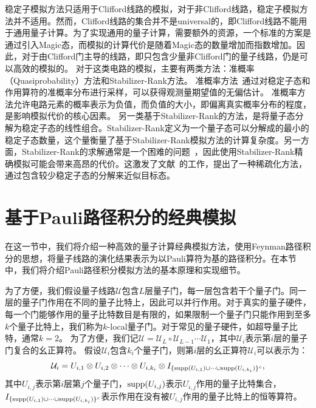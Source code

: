 稳定子模拟方法只适用于Clifford线路的模拟，对于非Clifford线路，稳定子模拟方法并不适用。然而，Clifford线路的集合并不是universal的，即Clifford线路不能用于通用量子计算。为了实现通用的量子计算，需要额外的资源，一个标准的方案是通过引入Magic态，而模拟的计算代价是随着Magic态的数量增加而指数增加。因此，对于由Clifford门主导的线路，即只包含少量非Clifford门的量子线路，仍是可以高效的模拟的。
对于这类电路的模拟，主要有两类方法：准概率（Quasiprobability）方法和Stabilizer-Rank方法。
准概率方法~\cite{pashayan2015estimating}通过对稳定子态和作用算符的准概率分布进行采样，可以获得观测量期望值的无偏估计。
准概率方法允许电路元素的概率表示为负值，而负值的大小，即偏离真实概率分布的程度，是影响模拟代价的核心因素。
另一类基于Stabilizer-Rank的方法，是将量子态分解为稳定子态的线性组合。Stabilizer-Rank定义为一个量子态可以分解成的最小的稳定子态数量，这个量衡量了基于Stabilizer-Rank模拟方法的计算复杂度。另一方面，Stabilizer-Rank的求解通常是一个困难的问题~\cite{bravyi2016improved}，因此使用Stabilizer-Rank精确模拟可能会带来高昂的代价。这激发了文献~\cite{bravyi2019simulation,qassim2019clifford}的工作，提出了一种稀疏化方法，通过包含较少稳定子态的分解来近似目标态。



\section{基于Pauli路径积分的经典模拟}
在这一节中，我们将介绍一种高效的量子计算经典模拟方法，使用Feynman路径积分的思想，将量子线路的演化结果表示为以Pauli算符为基的路径积分。在本节中，我们将介绍Pauli路径积分模拟方法的基本原理和实现细节。

为了方便，我们假设量子线路$\mathcal{U}$包含$L$层量子门，每一层包含若干个量子门。同一层的量子门作用在不同的量子比特上，因此可以并行作用。对于真实的量子硬件，每一个门能够作用的量子比特数目是有限的，如果限制一个量子门只能作用到至多$k$个量子比特上，我们称为$k$-local量子门。对于常见的量子硬件，如超导量子比特，通常$k=2$。
为了方便，我们记$\mathcal{U} = \mathcal{U}_L\circ \mathcal{U}_{L-1} \cdots \mathcal{U}_1$，其中$\mathcal{U}_i$表示第$i$层的量子门复合的幺正算符。
假设$\mathcal{U}_i$包含$k_i$个量子门，则第$i$层的幺正算符$\mathcal{U}_i$可以表示为：
\begin{equation}
    \mathcal{U}_i = U_{i,1} \otimes U_{i,2} \otimes \cdots \otimes U_{i,k_i}\otimes I_{\{\text{supp}(U_{i,1})\cup \cdots \cup \text{supp}(U_{i,k_i})\}^c},
\end{equation}
其中$U_{i,j}$表示第$i$层第$j$个量子门，$\text{supp}(U_{i,j})$表示$U_{i,j}$作用的量子比特集合，$I_{\{\text{supp}(U_{i,1})\cup \cdots \cup \text{supp}(U_{i,k_i})\}^c}$表示作用在没有被$U_{i,j}$作用的量子比特上的恒等算符。

